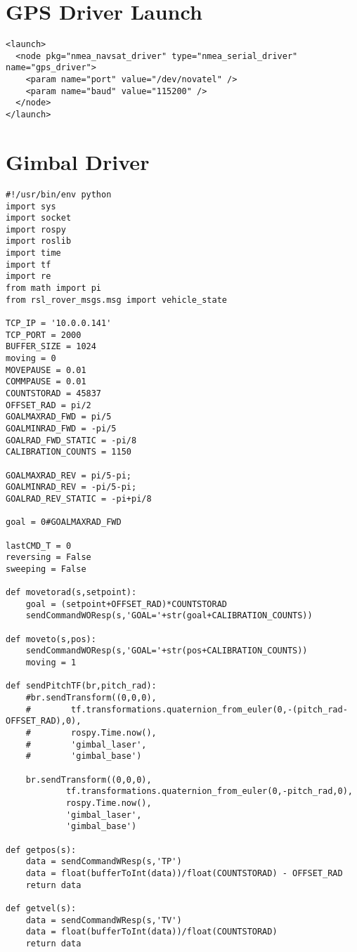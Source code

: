 \section{GPS Driver Launch}
\begin{verbatim}
<launch>
  <node pkg="nmea_navsat_driver" type="nmea_serial_driver" name="gps_driver">
    <param name="port" value="/dev/novatel" />
    <param name="baud" value="115200" />
  </node>
</launch>
\end{verbatim}

\section{Gimbal Driver}
\begin{verbatim}
#!/usr/bin/env python
import sys
import socket
import rospy
import roslib
import time
import tf
import re
from math import pi
from rsl_rover_msgs.msg import vehicle_state

TCP_IP = '10.0.0.141'
TCP_PORT = 2000
BUFFER_SIZE = 1024
moving = 0
MOVEPAUSE = 0.01
COMMPAUSE = 0.01
COUNTSTORAD = 45837
OFFSET_RAD = pi/2
GOALMAXRAD_FWD = pi/5
GOALMINRAD_FWD = -pi/5
GOALRAD_FWD_STATIC = -pi/8
CALIBRATION_COUNTS = 1150

GOALMAXRAD_REV = pi/5-pi;
GOALMINRAD_REV = -pi/5-pi;
GOALRAD_REV_STATIC = -pi+pi/8

goal = 0#GOALMAXRAD_FWD

lastCMD_T = 0
reversing = False
sweeping = False

def movetorad(s,setpoint):
    goal = (setpoint+OFFSET_RAD)*COUNTSTORAD        
    sendCommandWOResp(s,'GOAL='+str(goal+CALIBRATION_COUNTS))

def moveto(s,pos):
    sendCommandWOResp(s,'GOAL='+str(pos+CALIBRATION_COUNTS))
    moving = 1

def sendPitchTF(br,pitch_rad):
    #br.sendTransform((0,0,0),
    #        tf.transformations.quaternion_from_euler(0,-(pitch_rad-OFFSET_RAD),0),
    #        rospy.Time.now(),
    #        'gimbal_laser',
    #        'gimbal_base')

    br.sendTransform((0,0,0),
            tf.transformations.quaternion_from_euler(0,-pitch_rad,0),
            rospy.Time.now(),
            'gimbal_laser',
            'gimbal_base')

def getpos(s):
    data = sendCommandWResp(s,'TP')
    data = float(bufferToInt(data))/float(COUNTSTORAD) - OFFSET_RAD
    return data
    
def getvel(s):
    data = sendCommandWResp(s,'TV')
    data = float(bufferToInt(data))/float(COUNTSTORAD)
    return data


\end{verbatim}
